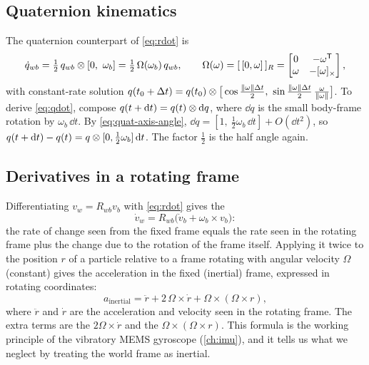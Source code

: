 \subsection{Quaternion kinematics}

The quaternion counterpart of \eqref{eq:rdot} is
\begin{equation}
  \dot q_{wb} = \tfrac12\, q_{wb} \qprod [0,\ \omega_b] = \tfrac12\,\Omega(\omega_b)\,q_{wb},
  \qquad \Omega(\omega) = [\,[0, \omega]\,]_R = \begin{bmatrix} 0 & -\omega\T \\ \omega & -\sx{\omega}\end{bmatrix},
  \label{eq:qdot}
\end{equation}
with constant-rate solution $q(t_0 + \Dt) = q(t_0)\qprod\big[\cos\tfrac{\|\omega\|\Dt}{2},\ \sin\tfrac{\|\omega\|\Dt}{2}\,\tfrac{\omega}{\|\omega\|}\big]$. To derive
\eqref{eq:qdot}, compose $q(t + \mathrm{d} t) = q(t) \otimes \mathrm{d} q$, where $\dd q$ is the small body-frame rotation by $\omega_b\,\dd t$. By
\eqref{eq:quat-axis-angle}, $\dd q = [1,\ \tfrac12\omega_b\,\dd t] + O(\dd t^2)$, so $q(t + \mathrm{d} t) - q(t) = q\otimes[0, \tfrac12\omega_b]\,\mathrm{d} t$. The factor $\tfrac12$ is
the half angle again.

\subsection{Derivatives in a rotating frame}

Differentiating $v_w = R_{wb}v_b$ with \eqref{eq:rdot} gives the 
\begin{equation}
  \dot v_w = R_{wb}\big(\dot v_b + \omega_b \times v_b\big):
  \label{eq:transport}
\end{equation}
the rate of change seen from the fixed frame equals the rate seen in the rotating frame plus the change due to the rotation of the frame itself.
Applying it twice to the position $r$ of a particle relative to a frame rotating with angular velocity $\Omega$ (constant) gives the acceleration
in the fixed (inertial) frame, expressed in rotating coordinates:
\begin{equation}
  a_{\mathrm{inertial}} = \ddot r + 2\,\Omega\times\dot r + \Omega\times(\Omega\times r),
  \label{eq:coriolis}
\end{equation}
where $\ddot r$ and $\dot r$ are the acceleration and velocity seen in the rotating frame. The extra terms are the 
$2\Omega\times\dot r$ and the  $\Omega\times(\Omega\times r)$. This formula is the working principle of the vibratory MEMS gyroscope
(\cref{ch:imu}), and it tells us what we neglect by treating the world frame as inertial.


